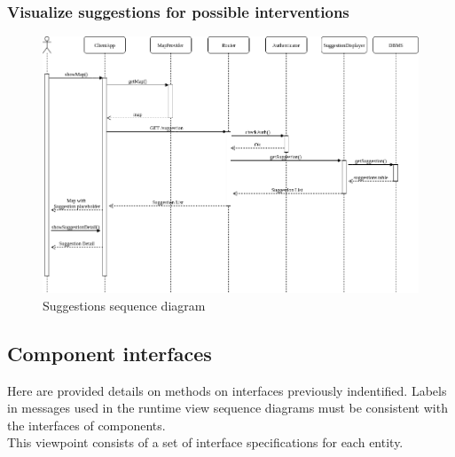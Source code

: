 \documentclass{article}
\begin{document}
\newpage
\subsubsection{Visualize suggestions for possible interventions}
\begin{figure}[h!]
\centering
	\includegraphics[width=1.0\textwidth]{images/visualize-suggestion-sequence.png}
	\caption{Suggestions sequence diagram}
	\label{fig:visualize-suggestion-sequence}
\end{figure}



\newpage
\subsection{Component interfaces}
Here are provided details on methods on interfaces previously indentified. Labels in messages used in the runtime view sequence diagrams must be consistent with the interfaces of components.
\\
This viewpoint consists of a set of interface specifications for each entity.
\end{document}
